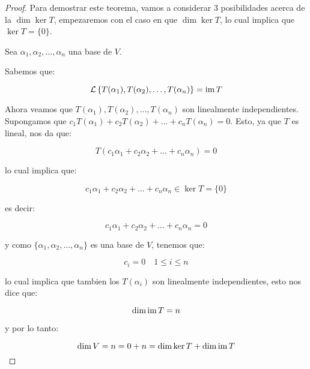 		\begin{proof}
			Para demostrar este teorema, vamos a considerar 3 posibilidades acerca de la $\dim{\ker{T}}$, empezaremos con el caso en que $\dim{\ker{T}}$, lo cual implica que $\ker{T} = \{0\}$.

			Sea $\alpha_1, \alpha_2, \dots, \alpha_n$ una base de $V$.

			Sabemos que:

			\begin{equation*}
				\mathcal{L} \left\{ T(\alpha_1), T(\alpha_2), \dots, T(\alpha_n) \right\} = \operatorname{im}{T}
			\end{equation*}

			Ahora veamos que $T(\alpha_1), T(\alpha_2), \dots, T(\alpha_n)$ son linealmente independientes.
			Supongamos que $c_1 T(\alpha_1) + c_2 T(\alpha_2) + \dots + c_n T(\alpha_n) = 0$. Esto, ya que $T$ es lineal, nos da que:

			\begin{equation*}
				T(c_1 \alpha_1 + c_2 \alpha_2 + \dots + c_n \alpha_n) = 0
			\end{equation*}

			lo cual implica que:

			\begin{equation*}
				c_1 \alpha_1 + c_2 \alpha_2 + \dots + c_n \alpha_n \in \ker{T} = \{0\}
			\end{equation*}

			es decir:

			\begin{equation*}
				c_1 \alpha_1 + c_2 \alpha_2 + \dots + c_n \alpha_n = 0
			\end{equation*}

			y como $\{\alpha_1, \alpha_2, \dots, \alpha_n\}$ es una base de $V$, tenemos que:

			\begin{equation*}
				c_i = 0 \quad 1 \leq i \leq n
			\end{equation*}

			lo cual implica que tambien los $T(\alpha_i)$ son linealmente independientes, esto nos dice que:

			\begin{equation*}
				\dim{\operatorname{im}{T}} = n
			\end{equation*}

			y por lo tanto:

			\begin{equation*}
				\dim{V} = n = 0 + n = \dim{\ker{T}} + \dim{\operatorname{im}{T}}
			\end{equation*}


\end{proof}
